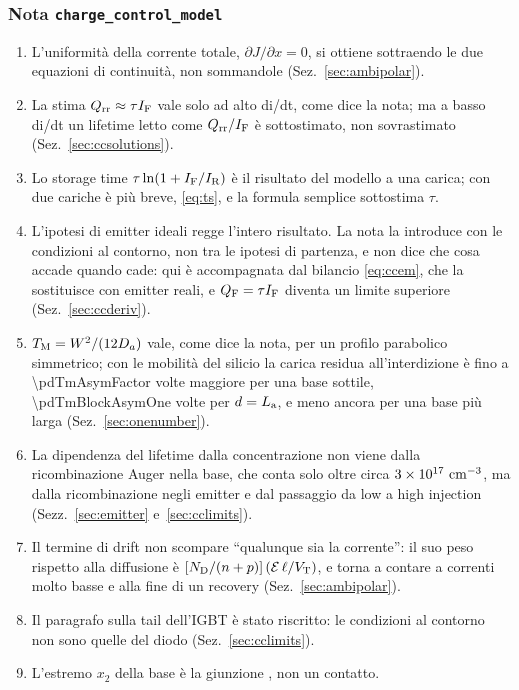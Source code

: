\documentclass[10pt,a4paper]{scrartcl}
\let\newcommand\pdvaluedefine
\newcommand{\IF}{I_\mathrm{F}}
\newcommand{\IR}{I_\mathrm{R}}
\newcommand{\Qrr}{Q_\mathrm{rr}}
\newcommand{\TM}{T_\mathrm{M}}
\newcommand{\VT}{V_\mathrm{T}}
\newcommand{\Ef}{\mathcal{E}}                 %
\newcommand{\ND}{N_\mathrm{D}}
\newcommand{\La}{L_\mathrm{a}}
\newcommand{\QF}{Q_\mathrm{F}}
\newcommand{\Nm}{n\textsuperscript{--}}
\newcommand{\Np}{n\textsuperscript{+}}
\newcommand{\cmc}{\si{\centi\metre^{-3}}}
\begin{document}
\subsubsection*{Nota \texttt{charge\_control\_model}}
\begin{enumerate}
\item L'uniformità della corrente totale, $\partial J/\partial x = 0$, si ottiene sottraendo le due equazioni di continuità, non sommandole (Sez.~\ref{sec:ambipolar}).
\item La stima $\Qrr \approx \tau\IF$ vale solo ad alto di/dt, come dice la nota; ma a basso di/dt un lifetime letto come $\Qrr/\IF$ è sottostimato, non sovrastimato (Sez.~\ref{sec:ccsolutions}).
\item Lo storage time $\tau\ln(1+\IF/\IR)$ è il risultato del modello a una carica; con due cariche è più breve, \eqref{eq:ts}, e la formula semplice sottostima $\tau$.
\item L'ipotesi di emitter ideali regge l'intero risultato. La nota la introduce con le condizioni al contorno, non tra le ipotesi di partenza, e non dice che cosa accade quando cade: qui è accompagnata dal bilancio \eqref{eq:ccem}, che la sostituisce con emitter reali, e $\QF = \tau\IF$ diventa un limite superiore (Sez.~\ref{sec:ccderiv}).
\item $\TM = W^2/(12D_a)$ vale, come dice la nota, per un profilo parabolico simmetrico; con le mobilità del silicio la carica residua all'interdizione è fino a \num{\pdTmAsymFactor} volte maggiore per una base sottile, \num{\pdTmBlockAsymOne} volte per $d = \La$, e meno ancora per una base più larga (Sez.~\ref{sec:onenumber}).
\item La dipendenza del lifetime dalla concentrazione non viene dalla ricombinazione Auger nella base, che conta solo oltre circa $3\times10^{17}\ \cmc$, ma dalla ricombinazione negli emitter e dal passaggio da low a high injection (Sezz.~\ref{sec:emitter} e~\ref{sec:cclimits}).
\item Il termine di drift non scompare ``qualunque sia la corrente'': il suo peso rispetto alla diffusione è $[\ND/(n+p)]\,(\Ef\,\ell/\VT)$, e torna a contare a correnti molto basse e alla fine di un recovery (Sez.~\ref{sec:ambipolar}).
\item Il paragrafo sulla tail dell'IGBT è stato riscritto: le condizioni al contorno non sono quelle del diodo (Sez.~\ref{sec:cclimits}).
\item L'estremo $x_2$ della base è la giunzione \Nm\Np, non un contatto.
\end{enumerate}
\end{document}

